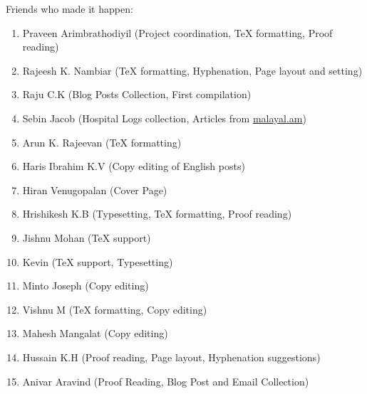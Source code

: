 \begin{english}
Friends who made it happen:
\begin{enumerate}
 \itemsep0em
 \item Praveen Arimbrathodiyil (Project coordination, {\TeX} formatting, Proof reading)
 \item Rajeesh K. Nambiar ({\TeX} formatting, Hyphenation, Page layout and setting)
 \item Raju C.K (Blog Posts Collection, First compilation)
 \item Sebin Jacob (Hospital Logs collection, Articles from \url{malayal.am})
 \item Arun K. Rajeevan ({\TeX} formatting)
 \item Haris Ibrahim K.V (Copy editing of English posts)
 \item Hiran Venugopalan (Cover Page)
 \item Hrishikesh K.B (Typesetting, {\TeX} formatting, Proof reading)
 \item Jishnu Mohan ({\TeX} support)
 \item Kevin ({\TeX} support, Typesetting)
 \item Minto Joseph (Copy editing)
 \item Vishnu M ({\TeX} formatting, Copy editing)
 \item Mahesh Mangalat (Copy editing)
 \item Hussain K.H (Proof reading, Page layout, Hyphenation suggestions)
 \item Anivar Aravind (Proof Reading, Blog Post and Email Collection)
\end{enumerate}
\end{english}
\newpage

